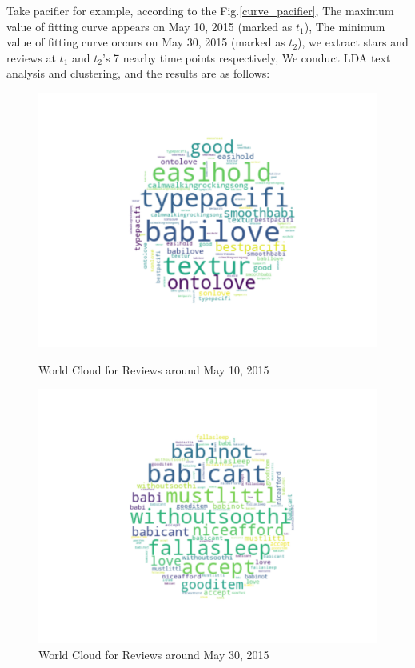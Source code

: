\documentclass{mcmthesis}
\begin{document}
Take pacifier for example, according to the Fig.\ref{curve_pacifier}, The maximum value of fitting curve appears on May 10, 2015 (marked as $t_{1}$), The minimum value of fitting curve occurs on May 30, 2015 (marked as $t_{2}$), we extract stars and reviews at $t_{1}$ and $t_{2}$'s 7 nearby time points respectively, We conduct LDA text analysis and clustering, and the results are as follows:
\begin{figure}[H]
\begin{minipage}[t]{0.48\linewidth}	
\centering
\includegraphics[width=1.0\textwidth]{figures/c_1.png}
\caption{World Cloud for Reviews around May 10, 2015}	  
\label{c_1}
\end{minipage}
\hfill
\begin{minipage}[t]{0.48\linewidth}	
\centering
\includegraphics[width=1.0\textwidth]{figures/c_2.png}
\caption{World Cloud for Reviews around May 30, 2015}	  
\end{minipage}
\end{figure}
\end{document}
